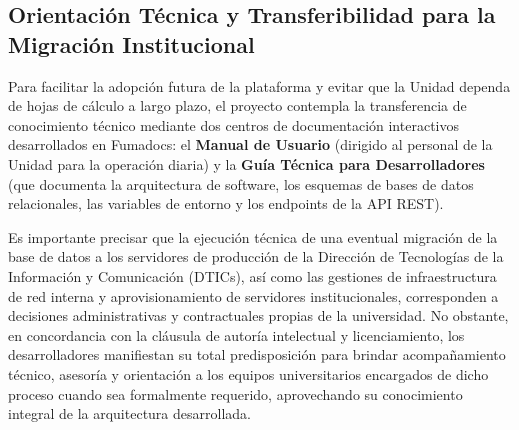 \subsection{Orientación Técnica y Transferibilidad para la Migración Institucional}

Para facilitar la adopción futura de la plataforma y evitar que la Unidad dependa de hojas de cálculo a largo plazo, el proyecto contempla la transferencia de conocimiento técnico mediante dos centros de documentación interactivos desarrollados en Fumadocs: el \textbf{Manual de Usuario} (dirigido al personal de la Unidad para la operación diaria) y la \textbf{Guía Técnica para Desarrolladores} (que documenta la arquitectura de software, los esquemas de bases de datos relacionales, las variables de entorno y los endpoints de la API REST). 

Es importante precisar que la ejecución técnica de una eventual migración de la base de datos a los servidores de producción de la Dirección de Tecnologías de la Información y Comunicación (DTICs), así como las gestiones de infraestructura de red interna y aprovisionamiento de servidores institucionales, corresponden a decisiones administrativas y contractuales propias de la universidad. No obstante, en concordancia con la cláusula de autoría intelectual y licenciamiento, los desarrolladores manifiestan su total predisposición para brindar acompañamiento técnico, asesoría y orientación a los equipos universitarios encargados de dicho proceso cuando sea formalmente requerido, aprovechando su conocimiento integral de la arquitectura desarrollada.